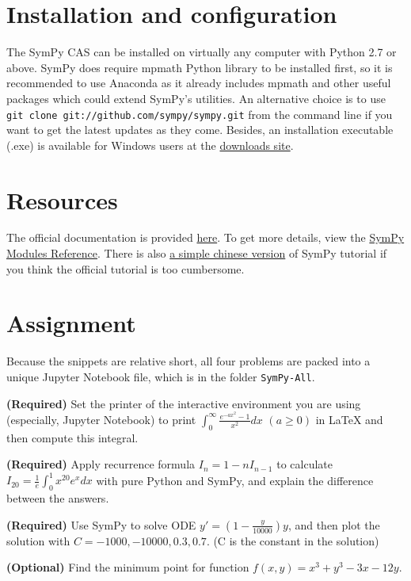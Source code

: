 \documentclass[english]{../TeXTemplate/pkupaper}
\title{\titlemark}
\author{Xiang Meng}
\date{Updated on April 9}
\begin{document}
\maketitle

\section{Installation and configuration}
The SymPy CAS can be installed on virtually any computer with Python 2.7 or above. SymPy does require mpmath Python library to be installed first, so it is recommended to use Anaconda as it already includes mpmath and
other useful packages which could extend SymPy's utilities. An alternative choice is to use \verb"git clone git://github.com/sympy/sympy.git" from the command line if you want to get the latest updates as they come.
Besides, an installation executable (.exe) is available for Windows users at the \href{https://github.com/sympy/sympy/releases}{downloads site}.

\section{Resources}
The official documentation is provided \href{http://docs.sympy.org/latest/tutorial/index.html}{here}. To get more
details, view the \href{http://docs.sympy.org/latest/modules/index.html}{SymPy Modules Reference}. There is also
\href{http://ju.outofmemory.cn/entry/80895}{a simple chinese version} of SymPy tutorial if you think the official tutorial is too cumbersome. 

\section{Assignment}

Because the snippets are relative short, all four problems are packed into a unique Jupyter Notebook file, which is in the folder \verb"SymPy-All".

\begin{partlist}
\item \textbf{(Required)} Set the printer of the interactive environment you are using (especially, Jupyter Notebook) to print $\int_{0}^{\infty} \frac{e^{-ax^2}-1}{x^2}dx\,\,(a\ge 0)$ in LaTeX and then compute this integral.
\item \textbf{(Required)} Apply recurrence formula $I_{n}=1 - n I_{n-1}$ to calculate $I_{20}=\frac{1}{e}\int_{0}^{1}x^{20}e^x dx$ with pure Python and SymPy, and explain the difference between the answers.
\item \textbf{(Required)} Use SymPy to solve ODE $y' = (1-\frac{y}{10000}) y$, and then plot the solution with $C=-1000, -10000, 0.3, 0.7$. (C is the constant in the solution)
\item \textbf{(Optional)} Find the minimum point for function $f(x,y)=x^3+y^3-3x-12y$.
\end{partlist}
\end{document}
